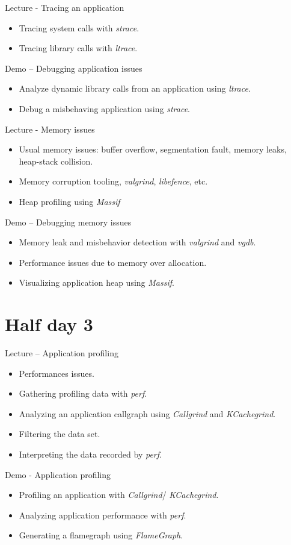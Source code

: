 \documentclass[a4paper,12pt,obeyspaces,spaces,hyphens]{article}
\begin{document}
\feagendatwocolumn
{Lecture - Tracing an application}
{
  \begin{itemize}
  \item Tracing system calls with {\em strace}.
  \item Tracing library calls with {\em ltrace}.
  \end{itemize}
}
{Demo – Debugging application issues}
{
  \begin{itemize}
  \item Analyze dynamic library calls from an application using
    {\em ltrace}.
  \item Debug a misbehaving application using {\em strace}.
  \end{itemize}
}

\feagendatwocolumn
{Lecture - Memory issues}
{
  \begin{itemize}
  \item Usual memory issues: buffer overflow, segmentation fault,
    memory leaks, heap-stack collision.
  \item Memory corruption tooling, {\em valgrind}, {\em libefence},
    etc.
  \item Heap profiling using {\em Massif}
  \end{itemize}
}
{Demo – Debugging memory issues}
{
  \begin{itemize}
  \item Memory leak and misbehavior detection with {\em valgrind} and
    {\em vgdb}.
  \item Performance issues due to memory over allocation.
  \item Visualizing application heap using {\em Massif}.
  \end{itemize}
}

\section{Half day 3}

\feagendatwocolumn
{Lecture – Application profiling}
{
  \begin{itemize}
  \item Performances issues.
  \item Gathering profiling data with {\em perf}.
  \item Analyzing an application callgraph using {\em Callgrind}
    and {\em KCachegrind}.
  \item Filtering the data set.
  \item Interpreting the data recorded by {\em perf}.
  \end{itemize}
}
{Demo - Application profiling}
{
  \begin{itemize}
  \item Profiling an application with {\em Callgrind}/{\em
      KCachegrind}.
  \item Analyzing application performance with {\em perf}.
  \item Generating a flamegraph using {\em FlameGraph}.
  \end{itemize}
}
\end{document}
